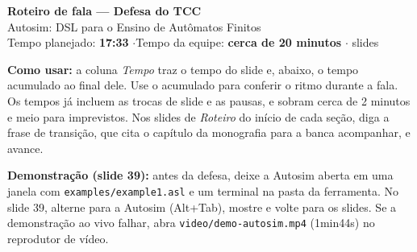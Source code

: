 \documentclass[11pt,a4paper]{article}
\newcommand{\cad}[1]{\texttt{#1}}
\begin{document}
\begin{center}
  {\Large\bfseries Roteiro de fala — Defesa do TCC}\\[4pt]
  Autosim: DSL para o Ensino de Autômatos Finitos\\[2pt]
  {\small Tempo planejado: \textbf{17:33} \quad$\cdot$\quad Tempo da equipe: \textbf{cerca de 20 minutos} \quad$\cdot$ slides}
\end{center}

\vspace{4pt}
{\small
\textbf{Como usar:} a coluna \emph{Tempo} traz o tempo do slide e, abaixo, o tempo acumulado ao
final dele. Use o acumulado para conferir o ritmo durante a fala. Os tempos já incluem as trocas de
slide e as pausas, e sobram cerca de 2 minutos e meio para imprevistos. Nos slides de \emph{Roteiro} do início
de cada seção, diga a frase de transição, que cita o capítulo da monografia para a banca
acompanhar, e avance.

\textbf{Demonstração (slide 39):} antes da defesa, deixe a Autosim aberta em uma janela com
\cad{examples/example1.asl} e um terminal na pasta da ferramenta. No slide 39, alterne para a
Autosim (Alt+Tab), mostre e volte para os slides. Se a demonstração ao vivo falhar, abra
\cad{video/demo-autosim.mp4} (1min44s) no reprodutor de vídeo.
}

\vspace{6pt}
\end{document}
